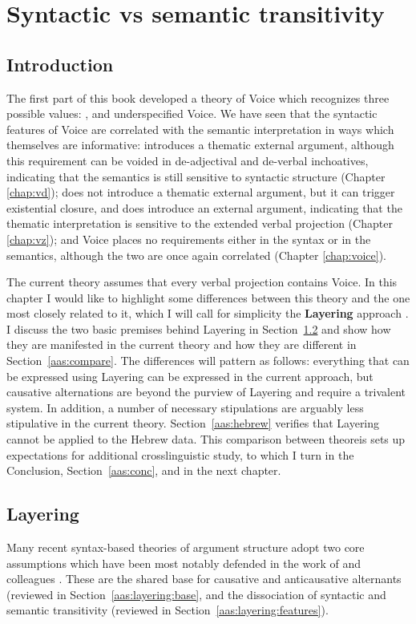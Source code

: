 \chapter{Syntactic vs semantic transitivity}
\label{chap:aas}

\section{Introduction} \label{sec:intro}
The first part of this book developed a theory of Voice which recognizes three possible values: {\vd}, {\vz} and underspecified Voice. We have seen that the syntactic features of Voice are correlated with the semantic interpretation in ways which themselves are informative: {\vd} introduces a thematic external argument, although this requirement can be voided in de-adjectival and de-verbal inchoatives, indicating that the semantics is still sensitive to syntactic structure (Chapter \ref{chap:vd}); {\vz} does not introduce a thematic external argument, but it can trigger existential closure, and {\pz} does introduce an external argument, indicating that the thematic interpretation is sensitive to the extended verbal projection (Chapter \ref{chap:vz}); and Voice places no requirements either in the syntax or in the semantics, although the two are once again correlated (Chapter \ref{chap:voice}).

The current theory assumes that every verbal projection contains Voice. In this chapter I would like to highlight some differences between this theory and the one most closely related to it, which I will call for simplicity the \textbf{Layering} approach \citep{schaefer08,layering15}. I discuss the two basic premises behind Layering in Section~\ref{aas:layering} and show how they are manifested in the current theory and how they are different in Section~\ref{aas:compare}. The differences will pattern as follows: everything that can be expressed using Layering can be expressed in the current approach, but causative alternations are beyond the purview of Layering and require a trivalent system. In addition, a number of necessary stipulations are arguably less stipulative in the current theory. Section~\ref{aas:hebrew} verifies that Layering cannot be applied to the Hebrew data. This comparison between theoreis sets up expectations for additional crosslinguistic study, to which I turn in the Conclusion, Section~\ref{aas:conc}, and in the next chapter.


\section{Layering} \label{aas:layering}
Many recent syntax-based theories of argument structure adopt two core assumptions which have been most notably defended in the work of \cite{schaefer08} and colleagues \citep{alexiadouetal06,layering15}. These are the shared base for causative and anticausative alternants (reviewed in Section~\ref{aas:layering:base}, and the dissociation of syntactic and semantic transitivity (reviewed in Section~\ref{aas:layering:features}).

